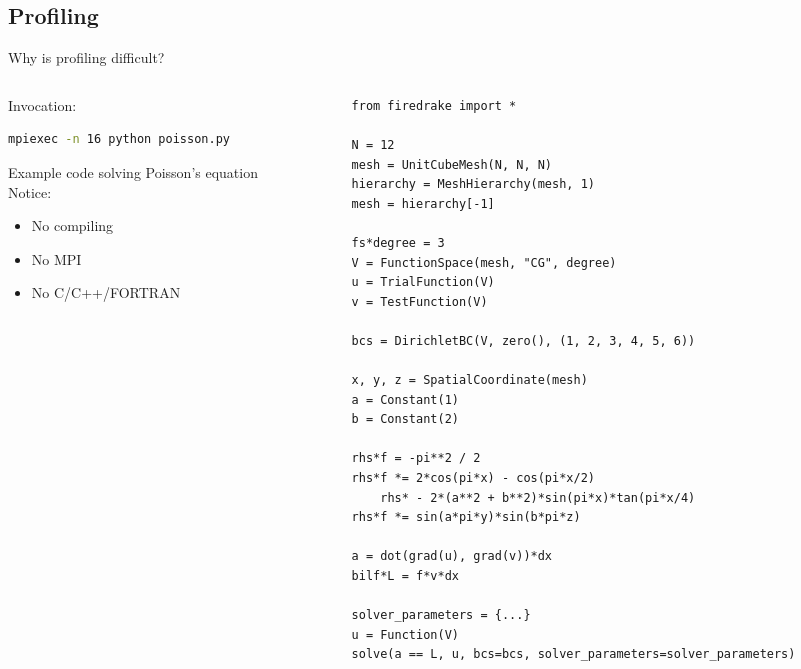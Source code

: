 \documentclass[pdf,aspectratio=169]{beamer}
\begin{document}
\subsection{Profiling}
\begin{frame}[fragile]{Why is profiling difficult?}
\begin{columns}[T]
\begin{column}[T]{0.45\textwidth}
Invocation:
\begin{lstlisting}[language={bash}]
mpiexec -n 16 python poisson.py
\end{lstlisting}

Example code solving Poisson's equation\\
Notice:
\begin{itemize}
	\item No compiling
	\item No MPI
	\item No C/C++/FORTRAN
\end{itemize}
\end{column}
\begin{column}[T]{0.45\textwidth}
\vspace{-3em}
\begin{lstlisting}[language={[highlighting]python}]
from firedrake import *

N = 12
mesh = UnitCubeMesh(N, N, N)
hierarchy = MeshHierarchy(mesh, 1)
mesh = hierarchy[-1]

fs*degree = 3
V = FunctionSpace(mesh, "CG", degree)
u = TrialFunction(V)
v = TestFunction(V)

bcs = DirichletBC(V, zero(), (1, 2, 3, 4, 5, 6))

x, y, z = SpatialCoordinate(mesh)
a = Constant(1)
b = Constant(2)

rhs*f = -pi**2 / 2
rhs*f *= 2*cos(pi*x) - cos(pi*x/2)
    rhs* - 2*(a**2 + b**2)*sin(pi*x)*tan(pi*x/4)
rhs*f *= sin(a*pi*y)*sin(b*pi*z)

a = dot(grad(u), grad(v))*dx
bilf*L = f*v*dx

solver_parameters = {...}
u = Function(V)
solve(a == L, u, bcs=bcs, solver_parameters=solver_parameters)
\end{lstlisting}
\end{column}
\end{columns}
\end{frame}
\end{document}
